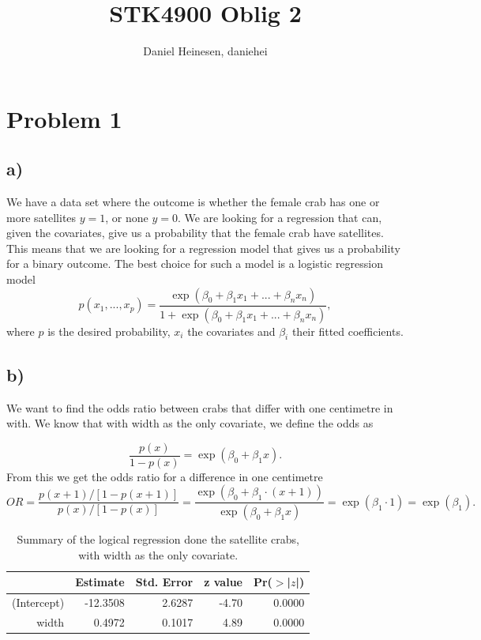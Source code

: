\documentclass[a4paper,norsk, 10pt]{article}
\title{STK4900 Oblig 2}
\author{Daniel Heinesen, daniehei}
\begin{document}
\maketitle

\section{Problem 1}
\subsection{a)}
We have a data set where the outcome is whether the female crab has one or more satellites $y = 1$, or none $y=0$. We are looking for a regression that can, given the covariates, give us a probability that the female crab have satellites. This means that we are looking for a regression model that gives us a probability for a binary outcome. The best choice for such a model is a logistic regression model
\begin{equation}
p(x_1,...,x_p) = \frac{\exp(\beta_0 + \beta_1 x_1 + ... + \beta_n x_n)}{1+\exp(\beta_0 + \beta_1 x_1 + ... + \beta_n x_n)},
\end{equation}
where $p$ is the desired probability, $x_i$ the covariates and $\beta_i$ their fitted coefficients.

\subsection{b)}

We want to find the odds ratio between crabs that differ with one centimetre in with. We know that with width as the only covariate, we define the odds as 

\begin{equation}
\frac{p(x)}{1-p(x)} = \exp(\beta_0 + \beta_1 x).
\end{equation}
From this we get the odds ratio for a difference in one centimetre
\begin{equation}
OR = \frac{p(x+1)/[1-p(x+1)]}{p(x)/[1-p(x)]} = \frac{\exp(\beta_0 + \beta_1\cdot (x+1))}{\exp(\beta_0 + \beta_1 x)} = \exp(\beta_1\cdot 1) = \exp(\beta_1).
\end{equation}


\begin{table}[!ht]
\centering
\begin{tabular}{rrrrr}
  \hline
 & Estimate & Std. Error & z value & Pr($>$|$z$|) \\ 
  \hline
(Intercept) & -12.3508 & 2.6287 & -4.70 & 0.0000 \\ 
  width & 0.4972 & 0.1017 & 4.89 & 0.0000 \\ 
   \hline
\end{tabular}
\caption{Summary of the logical regression done the satellite crabs, with width as the only covariate.}\label{tab:crab_width}
\end{table}
\end{document}
